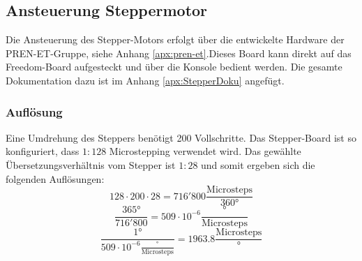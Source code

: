     \subsection{Ansteuerung Steppermotor}
    \label{sec:StepperAnsteuerung}
        Die Ansteuerung des Stepper-Motors erfolgt über die entwickelte Hardware der PREN-ET-Gruppe,
        siehe Anhang \ref{apx:pren-et}.Dieses Board kann direkt auf das Freedom-Board aufgesteckt 
        und über die Konsole bedient werden. Die gesamte Dokumentation dazu ist im Anhang 
        \ref{apx:StepperDoku} angefügt. 
        
        \subsubsection{Auflösung}
        \label{sec:Aufloesung}
            Eine Umdrehung des Steppers benötigt 200 Vollschritte. Das Stepper-Board ist so konfiguriert, 
            dass $1:128$ Microstepping verwendet wird. Das gewählte Übersetzungsverhältnis vom 
            Stepper ist $1:28$ und somit ergeben sich die folgenden Auflösungen:
            \begin{equation}
                128 \cdot 200 \cdot 28 = 716'800\frac{\text{Microsteps}}{360\si{\degree}}
            \end{equation}
            \begin{equation}
                \frac{365\si{\degree}}{716'800} = 509 \cdot 10^{-6}\frac{\si{\degree}}{\text{Microsteps}}
            \end{equation}
            \begin{equation}
               \frac{1\si{\degree}}{509 \cdot 10^{-6}\frac{\si{\degree}}{\text{Microsteps}}} = 1963.8\frac{\text{Microsteps}}{\si{\degree}}
            \end{equation}
            